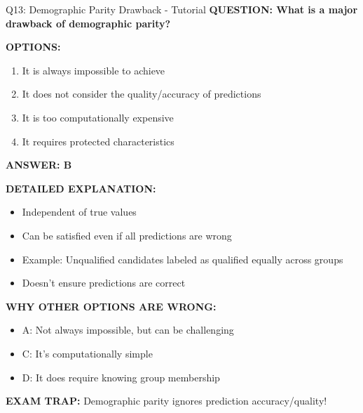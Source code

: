 \documentclass[8pt]{beamer}
\begin{document}
	\begin{frame}{Q13: Demographic Parity Drawback - Tutorial}
		\fontsize{6.5}{7.5}\selectfont
		\textbf{QUESTION: What is a major drawback of demographic parity?}
		
		\vspace{0.1cm}
		\textbf{OPTIONS:}
		\begin{enumerate}
			\item It is always impossible to achieve
			\item It does not consider the quality/accuracy of predictions
			\item It is too computationally expensive
			\item It requires protected characteristics
		\end{enumerate}
		
		\vspace{0.1cm}
		\textcolor{myblue}{\textbf{ANSWER: B}}
		
		\vspace{0.1cm}
		\textbf{DETAILED EXPLANATION:}
		\begin{itemize}
			\item Independent of true values
			\item Can be satisfied even if all predictions are wrong
			\item Example: Unqualified candidates labeled as qualified equally across groups
			\item Doesn't ensure predictions are correct
		\end{itemize}
		
		\vspace{0.1cm}
		\textcolor{myred}{\textbf{WHY OTHER OPTIONS ARE WRONG:}}
		\begin{itemize}
			\item \textcolor{myred}{A:} Not always impossible, but can be challenging
			\item \textcolor{myred}{C:} It's computationally simple
			\item \textcolor{myred}{D:} It does require knowing group membership
		\end{itemize}
		
		\textcolor{myred}{\textbf{EXAM TRAP:}} Demographic parity ignores \textcolor{myblue}{prediction accuracy/quality}!
	\end{frame}
	
\end{document}
